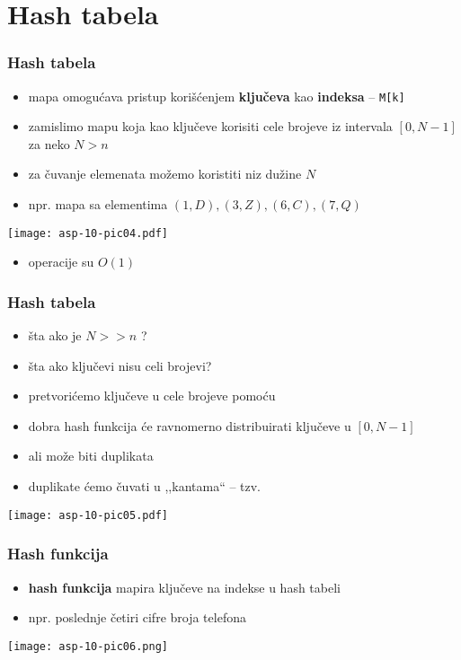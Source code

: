 \documentclass[compress]{beamer}
\begin{document}
\section[Hash tabela]{Hash tabela}
\begin{frame}[fragile]
  \frametitle{Hash tabela}
  \begin{itemize}
    \item mapa omogućava pristup korišćenjem \textbf{ključeva} kao \textbf{indeksa} -- \texttt{M[k]}  
    \item zamislimo mapu koja kao ključeve korisiti cele brojeve iz intervala $[0, N-1]$ za neko $N > n$
    \item za čuvanje elemenata možemo koristiti  niz dužine $N$
    \item npr. mapa sa elementima $(1,D), (3,Z), (6,C), (7,Q)$
  \end{itemize}
  \begin{center}
    \texttt{[image: asp-10-pic04.pdf]}
  \end{center}
  \begin{itemize}
    \item operacije su $O(1)$  
  \end{itemize}
\end{frame}

\begin{frame}[fragile]
  \frametitle{Hash tabela}
  \begin{itemize}
    \item šta ako je $N >> n$ ?  
    \item šta ako ključevi nisu celi brojevi?
    \item pretvorićemo ključeve u cele brojeve pomoću 
    \item dobra hash funkcija će ravnomerno distribuirati ključeve u $[0,N-1]$
    \item ali može biti duplikata
    \item duplikate ćemo čuvati u ,,kantama`` -- tzv. 
  \end{itemize}
  \begin{center}
    \texttt{[image: asp-10-pic05.pdf]}
  \end{center}
\end{frame}

\begin{frame}[fragile]
  \frametitle{Hash funkcija}
  \begin{itemize}
    \item \textbf{hash funkcija} mapira ključeve na indekse u hash tabeli  
    \item npr. poslednje četiri cifre broja telefona
  \end{itemize}
  \begin{center}
    \texttt{[image: asp-10-pic06.png]}
  \end{center}
\end{frame}
\end{document}
